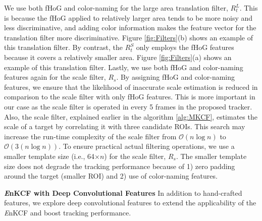\documentclass[10pt,twocolumn,letterpaper]{article}
\begin{document}
We use both fHoG \cite{felzenszwalb2010object} and color-naming
\cite{van2009learning} for the large area translation filter,
$R_{t}^{L}$. This is because the fHoG applied to relatively larger
area tends to be more noisy and less discriminative, and adding color
information makes the feature vector for the translation filter more
discriminative. Figure \ref{fig:Filters}(b) shows an example of this
translation filter. By contrast, the $R_{t}^{S}$ only employs the fHoG
features because it covers a relatively smaller area.  Figure
\ref{fig:Filters}(a) shows an example of this translation
filter. Lastly, we use both fHoG and color-naming features again for
the scale filter, $R_{s}$. By assigning fHoG and color-naming
features, we ensure that the likelihood of inaccurate scale estimation
is reduced in comparison to the scale filter with only fHoG
features. This is more important in our case as the scale filter is
operated in every 5 frames in the proposed tracker. Also, the scale
filter, explained earlier in the algorithm \ref{alg:MKCF}, estimates
the scale of a target by correlating it with three candidate
ROIs. This search may increase the run-time complexity of the scale
filter from $\mathcal{O}(n\log n)$ to $\mathcal{O}(3(n\log n))$. To
ensure practical actual filtering operations, we use a smaller
template size (i.e., 64$\times n$) for the scale filter, $R_{s}$. The
smaller template size does not degrade the tracking performance
because of 1) zero padding around the target (smaller ROI) and 2) use
of color-naming features.

\textbf{{\it E}nKCF with Deep Convolutional Features} In addition to
hand-crafted features, we explore deep convolutional features to
extend the applicability of the {\it E}nKCF and boost tracking
performance.
\end{document}
